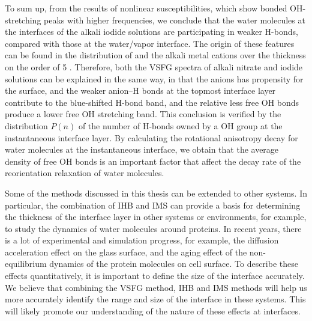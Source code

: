 To sum up, from the results of nonlinear susceptibilities, which show bonded OH-stretching peaks with higher frequencies, 
we conclude that the water molecules at the interfaces of the alkali iodide solutions are participating 
in weaker H-bonds, compared with those at the water/vapor interface. 
The origin of these features can be found in the distribution of \I and the alkali metal cations
over the thickness on the order of 5 \A. 
Therefore, both the VSFG spectra of alkali nitrate and iodide solutions can be explained in the same way, 
in that the anions has propensity for the surface, and the weaker anion--H bonds at the topmost interface layer contribute to the blue-shifted H-bond band,
and the relative less free OH bonds produce a lower free OH stretching band.
This conclusion is verified by the distribution $P(n)$ of the number of H-bonds owned by a OH group at the instantaneous interface layer. 
By calculating the rotational anisotropy decay for water molecules at the instantaneous interface, 
we obtain that the average density of free OH bonds is an important factor that affect the decay rate of the reorientation relaxation of water molecules.


Some of the methods discussed in this thesis can be extended to other systems.
In particular, the combination of IHB and IMS can provide a basis for determining the thickness of the interface layer in other systems or environments, 
for example, to study the dynamics of water molecules around proteins. 
In recent years, there is a lot of experimental and simulation progress, for example, the diffusion acceleration effect on the glass surface\cite{ZhuL11,ZhangWei16}, 
and the aging effect of the non-equilibrium dynamics of the protein molecules on cell surface\cite{HuXiaohu16}. 
To describe these effects quantitatively, it is important to define the size of the interface accurately. 
We believe that combining the VSFG method, IHB and IMS methods will help us more accurately identify the range and size of the interface in these systems.
This will likely promote our understanding of the nature of these effects at interfaces.


